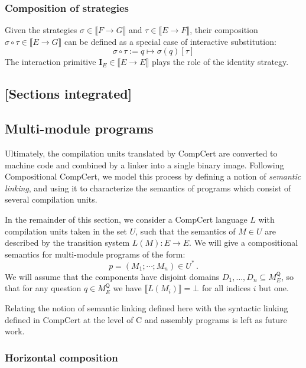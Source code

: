 \documentclass[format=sigplan,authordraft]{acmart}
\newcommand{\kw}[1]{\ensuremath{\mathsf{#1}}}
\begin{document}
\subsubsection{Composition of strategies}

Given the strategies
$\sigma \in \llbracket F \rightarrow G \rrbracket$ and
$\tau \in \llbracket E \rightarrow F \rrbracket$,
their composition
$\sigma \circ \tau \in \llbracket E \rightarrow G \rrbracket$
can be defined as a special case of interactive substitution:
\[
    \sigma \circ \tau := q \mapsto \sigma(q)[\tau]
\]
The interaction primitive
$\mathbf{I}_E \in \llbracket E \rightarrow E \rrbracket$
plays the role of the identity strategy.

\subsection*{[Sections integrated]}

\subsection{Multi-module programs}

Ultimately,
the compilation units translated by CompCert
are converted to machine code
and combined by a linker into a single
binary image.
Following Compositional CompCert,
we model this process by defining a notion of
\emph{semantic linking},
and using it to characterize the semantics
of programs which consist of several compilation units.

In the remainder of this section,
we consider a CompCert language $L$
with compilation units taken in the set $U$,
such that the semantics of $M \in U$
are described by the transition system $L(M) : E \rightarrow E$.
We will give a compositional semantics
for multi-module programs of the form:
\[
    p = (M_1; \cdots; M_n) \in U^* \,.
\]
We will assume that the components have disjoint domains
$D_1, \ldots, D_n \subseteq M_E^\kw{Q}$,
so that for any question $q \in M_E^\kw{Q}$
we have $\llbracket L(M_i) \rrbracket = \bot$
for all indices $i$ but one.

Relating the notion of semantic linking defined here
with the syntactic linking defined in CompCert
at the level of C and assembly programs
is left as future work.

\subsubsection{Horizontal composition}
\end{document}
